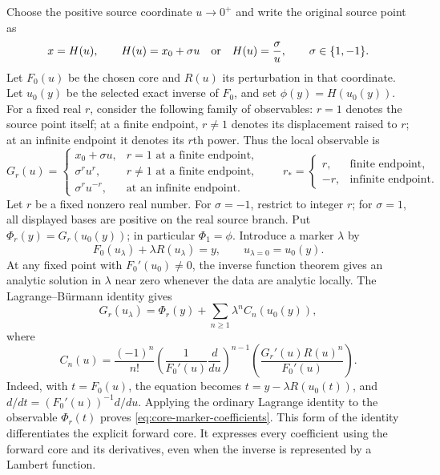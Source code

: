 Choose the positive source coordinate $u\to0^+$ and write the original source point as
\[
 x=H(u),\qquad
 H(u)=x_0+\sigma u\quad\hbox{or}\quad H(u)=\frac{\sigma}{u},
 \qquad \sigma\in\{1,-1\}.
\]
Let $F_0(u)$ be the chosen core and $R(u)$ its perturbation in that coordinate. Let $u_0(y)$ be the selected exact inverse of $F_0$, and set $\phi(y)=H(u_0(y))$. For a fixed real $r$, consider the following family of observables: $r=1$ denotes the source point itself; at a finite endpoint, $r\ne1$ denotes its displacement raised to $r$; at an infinite endpoint it denotes its $r$th power. Thus the local observable is
\begin{equation}
 G_r(u)=
 \begin{cases}
 x_0+\sigma u,&r=1\text{ at a finite endpoint},\\
 \sigma^r u^r,&r\ne1\text{ at a finite endpoint},\\
 \sigma^r u^{-r},&\text{at an infinite endpoint}.
 \end{cases}
 \qquad
 r_* = \begin{cases}r,&\text{finite endpoint},\\-r,&\text{infinite endpoint}.
 \end{cases}
 \label{eq:core-power-observable}
\end{equation}
Let $r$ be a fixed nonzero real number. For $\sigma=-1$, restrict to integer $r$; for $\sigma=1$, all displayed bases are
positive on the real source branch. Put $\Phi_r(y)=G_r(u_0(y))$; in
particular $\Phi_1=\phi$. Introduce a marker $\lambda$ by
\begin{equation}
 F_0(u_\lambda)+\lambda R(u_\lambda)=y,
 \qquad u_{\lambda=0}=u_0(y).
 \label{eq:core-marker-equation}
\end{equation}
At any fixed point with $F_0'(u_0)\ne0$, the inverse function theorem gives an analytic solution in $\lambda$ near zero whenever the data are analytic locally. The Lagrange--B\"urmann identity gives
\begin{equation}
 G_r(u_\lambda)=\Phi_r(y)+\sum_{n\ge1}\lambda^n C_n(u_0(y)),
 \label{eq:core-marker-series}
\end{equation}
where
\begin{equation}
 C_n(u)=\frac{(-1)^n}{n!}
 \left(\frac{1}{F_0'(u)}\frac{d}{du}\right)^{n-1}
 \left(\frac{G_r'(u)R(u)^n}{F_0'(u)}\right).
 \label{eq:core-marker-coefficients}
\end{equation}
Indeed, with $t=F_0(u)$, the equation becomes
$t=y-\lambda R(u_0(t))$, and $d/dt=(F_0'(u))^{-1}d/du$.
Applying the ordinary Lagrange identity to the observable $\Phi_r(t)$ proves
\eqref{eq:core-marker-coefficients}. This form of the identity differentiates
the explicit forward core. It expresses every coefficient using the forward core and its derivatives, even when the inverse is represented by a Lambert function.

